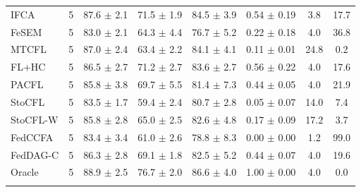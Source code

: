 {{\begin{tabular}{l r c c c c c c}
IFCA & 5 & 87.6 $\pm$ 2.1 & 71.5 $\pm$ 1.9 & 84.5 $\pm$ 3.9 & 0.54 $\pm$ 0.19 & 3.8 & 17.7 \\
FeSEM & 5 & 83.0 $\pm$ 2.1 & 64.3 $\pm$ 4.4 & 76.7 $\pm$ 5.2 & 0.22 $\pm$ 0.18 & 4.0 & 36.8 \\
MTCFL & 5 & 87.0 $\pm$ 2.4 & 63.4 $\pm$ 2.2 & 84.1 $\pm$ 4.1 & 0.11 $\pm$ 0.01 & 24.8 & 0.2 \\
FL+HC & 5 & 86.5 $\pm$ 2.7 & 71.2 $\pm$ 2.7 & 83.6 $\pm$ 2.7 & 0.56 $\pm$ 0.22 & 4.0 & 17.6 \\
PACFL & 5 & 85.8 $\pm$ 3.8 & 69.7 $\pm$ 5.5 & 81.4 $\pm$ 7.3 & 0.44 $\pm$ 0.05 & 4.0 & 21.9 \\
StoCFL & 5 & 83.5 $\pm$ 1.7 & 59.4 $\pm$ 2.4 & 80.7 $\pm$ 2.8 & 0.05 $\pm$ 0.07 & 14.0 & 7.4 \\
StoCFL-W & 5 & 85.8 $\pm$ 2.8 & 65.0 $\pm$ 2.5 & 82.6 $\pm$ 4.8 & 0.17 $\pm$ 0.09 & 17.2 & 3.7 \\
FedCCFA & 5 & 83.4 $\pm$ 3.4 & 61.0 $\pm$ 2.6 & 78.8 $\pm$ 8.3 & 0.00 $\pm$ 0.00 & 1.2 & 99.0 \\
FedDAG-C & 5 & 86.3 $\pm$ 2.8 & 69.1 $\pm$ 1.8 & 82.5 $\pm$ 5.2 & 0.44 $\pm$ 0.07 & 4.0 & 19.6 \\
Oracle & 5 & 88.9 $\pm$ 2.5 & 76.7 $\pm$ 2.0 & 86.6 $\pm$ 4.0 & 1.00 $\pm$ 0.00 & 4.0 & 0.0 \\
\addlinespace
\bottomrule
\end{tabular}}
}

